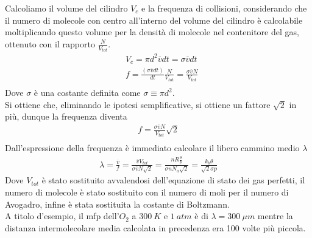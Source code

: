 \documentclass[10pt,a4paper]{article}
\begin{document}
\FloatBarrier
Calcoliamo il volume del cilindro $V_c$ e la frequenza di collisioni, considerando che il numero di molecole con centro all'interno del volume del cilindro è calcolabile moltiplicando questo volume per la densità di molecole nel contenitore del gas, ottenuto con il rapporto $\frac{N}{V_{tot}}$. 
\begin{align*} 
	&V_c = \pi d^2 \overline{v} dt = \sigma \overline{v} dt\\
	&f = \frac{\left(\sigma \overline{v} dt\right)}{dt} \frac{N}{V_{tot}} = \frac{\sigma \overline{v} N}{V_{tot}}\\
\end{align*} 
Dove $\sigma$ è una costante definita come $\sigma \equiv \pi d^2$.\\
Si ottiene che, eliminando le ipotesi semplificative, si ottiene un fattore $\sqrt{2}$ in più, dunque la frequenza diventa
\begin{align*} 
f = \frac{\sigma \overline{v} N}{V_{tot}}\sqrt{2}\\
\end{align*} 
Dall'espressione della frequenza è immediato calcolare il libero cammino medio $\lambda$
\begin{align*} 
	\lambda = \frac{\overline{v}}{f} = \frac{\overline{v} V_{tot}}{\sigma \overline{v} N\sqrt{2}} = \frac{n R \frac{\theta}{p} }{\sigma n N_a \sqrt{2}} = \frac{k_b\theta}{\sqrt{2}\sigma p}
\end{align*} 
Dove $V_{tot}$ è stato sostituito avvalendosi dell'equazione di stato dei gas perfetti, il numero di molecole è stato sostituito con il numero di moli per il numero di Avogadro, infine è stata sostituita la costante di Boltzmann.\\
A titolo d'esempio, il mfp dell'$O_2$ a $300\ K$ e $1\ atm$ è di $\lambda = 300\ \mu m$ mentre la distanza intermolecolare media calcolata in precedenza era 100 volte più piccola. 
\end{document}
